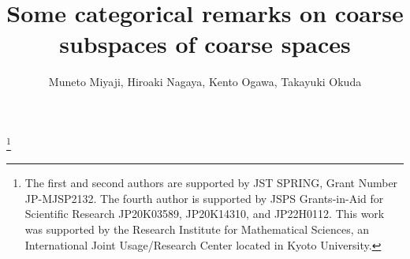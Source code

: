 \documentclass[12pt, a4paper]{amsart}
\theoremstyle{definition}
\begin{document}
\title[Some categorical remarks on coarse subspaces]{Some categorical remarks on coarse subspaces of coarse spaces}
\author[M.~Miyaji, H.~Nagaya, K.~Ogawa, T.~Okuda]{Muneto Miyaji, Hiroaki Nagaya, Kento Ogawa, Takayuki Okuda}
\thanks{
The first and second authors are supported by JST SPRING, Grant Number JP-MJSP2132. 
The fourth author is supported by JSPS Grants-in-Aid for Scientific Research JP20K03589, JP20K14310, and JP22H0112.
This work was supported by the Research Institute for Mathematical Sciences,
an International Joint Usage/Research Center located in Kyoto University.
}

\address[M.~Miyaji]{%
	Graduate School of Advanced Science and Engineering, Hiroshima University, 
    1-3-1 Kagamiyama, Higashi-Hiroshima City, Hiroshima, 739-8526, Japan.
        }
\address[H.~Nagaya]{%
	Graduate School of Advanced Science and Engineering, Hiroshima University, 
    1-3-1 Kagamiyama, Higashi-Hiroshima City, Hiroshima, 739-8526, Japan.
        }
\address[K.~Ogawa]{%
	Graduate School of Advanced Science and Engineering, Hiroshima University, 
    1-3-1 Kagamiyama, Higashi-Hiroshima City, Hiroshima, 739-8526, Japan.
        }
\address[T.~Okuda]{%
	Graduate School of Advanced Science and Engineering, Hiroshima University, 
    1-3-1 Kagamiyama, Higashi-Hiroshima City, Hiroshima, 739-8526, Japan.
        }

\maketitle
\end{document}
